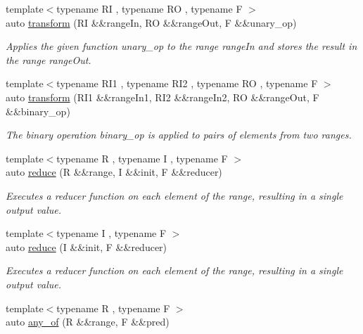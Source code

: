 \begin{DoxyCompactItemize}
\item 
{\footnotesize template$<$typename RI , typename RO , typename F $>$ }\\auto \mbox{\hyperlink{namespace_r_a_h___n_a_m_e_s_p_a_c_e_a98499dc6e9855d07b986c71618b6fd84}{transform}} (RI \&\&range\+In, RO \&\&range\+Out, F \&\&unary\+\_\+op)
\begin{DoxyCompactList}\small\item\em Applies the given function unary\+\_\+op to the range range\+In and stores the result in the range range\+Out. \end{DoxyCompactList}\item 
{\footnotesize template$<$typename R\+I1 , typename R\+I2 , typename RO , typename F $>$ }\\auto \mbox{\hyperlink{namespace_r_a_h___n_a_m_e_s_p_a_c_e_ae27e19739b326c99cc09b3f5959fca93}{transform}} (R\+I1 \&\&range\+In1, R\+I2 \&\&range\+In2, RO \&\&range\+Out, F \&\&binary\+\_\+op)
\begin{DoxyCompactList}\small\item\em The binary operation binary\+\_\+op is applied to pairs of elements from two ranges. \end{DoxyCompactList}\item 
{\footnotesize template$<$typename R , typename I , typename F $>$ }\\auto \mbox{\hyperlink{namespace_r_a_h___n_a_m_e_s_p_a_c_e_ae1f989f80f1fe3bf2eac4106e5d6fe35}{reduce}} (R \&\&range, I \&\&init, F \&\&reducer)
\begin{DoxyCompactList}\small\item\em Executes a reducer function on each element of the range, resulting in a single output value. \end{DoxyCompactList}\item 
{\footnotesize template$<$typename I , typename F $>$ }\\auto \mbox{\hyperlink{namespace_r_a_h___n_a_m_e_s_p_a_c_e_ad5beb1dcde4f4782304a4e3688b1851a}{reduce}} (I \&\&init, F \&\&reducer)
\begin{DoxyCompactList}\small\item\em Executes a reducer function on each element of the range, resulting in a single output value. \end{DoxyCompactList}\item 
{\footnotesize template$<$typename R , typename F $>$ }\\auto \mbox{\hyperlink{namespace_r_a_h___n_a_m_e_s_p_a_c_e_a1b528a9d2905dd9bbfca7076943f3f65}{any\+\_\+of}} (R \&\&range, F \&\&pred)

\end{DoxyCompactItemize}
